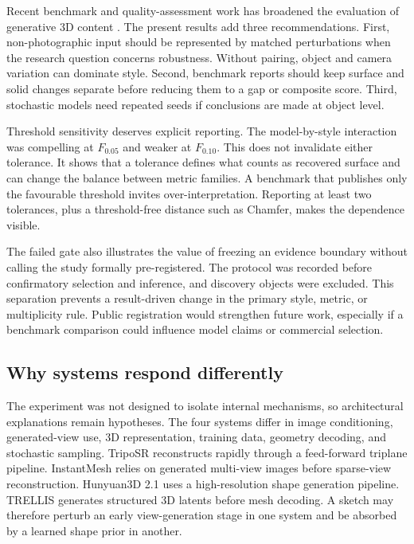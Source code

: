 \documentclass[12pt,a4paper]{article}
\begin{document}
Recent benchmark and quality-assessment work has broadened the evaluation of generative 3D content \parencite{jiang2025threedgenbench,ebert2025threedarena,fu2025si23dcqa}. The present results add three recommendations. First, non-photographic input should be represented by matched perturbations when the research question concerns robustness. Without pairing, object and camera variation can dominate style. Second, benchmark reports should keep surface and solid changes separate before reducing them to a gap or composite score. Third, stochastic models need repeated seeds if conclusions are made at object level.

Threshold sensitivity deserves explicit reporting. The model-by-style interaction was compelling at $F_{0.05}$ and weaker at $F_{0.10}$. This does not invalidate either tolerance. It shows that a tolerance defines what counts as recovered surface and can change the balance between metric families. A benchmark that publishes only the favourable threshold invites over-interpretation. Reporting at least two tolerances, plus a threshold-free distance such as Chamfer, makes the dependence visible.

The failed gate also illustrates the value of freezing an evidence boundary without calling the study formally pre-registered. The protocol was recorded before confirmatory selection and inference, and discovery objects were excluded. This separation prevents a result-driven change in the primary style, metric, or multiplicity rule. Public registration would strengthen future work, especially if a benchmark comparison could influence model claims or commercial selection.

\subsection{Why systems respond differently}

The experiment was not designed to isolate internal mechanisms, so architectural explanations remain hypotheses. The four systems differ in image conditioning, generated-view use, 3D representation, training data, geometry decoding, and stochastic sampling. TripoSR reconstructs rapidly through a feed-forward triplane pipeline. InstantMesh relies on generated multi-view images before sparse-view reconstruction. Hunyuan3D 2.1 uses a high-resolution shape generation pipeline. TRELLIS generates structured 3D latents before mesh decoding. A sketch may therefore perturb an early view-generation stage in one system and be absorbed by a learned shape prior in another.
\end{document}
